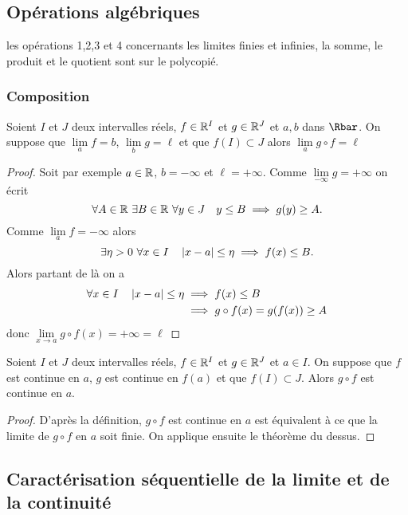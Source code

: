 \subsection{Opérations algébriques}

les opérations 1,2,3 et 4 concernants les limites finies et infinies, la somme, le produit et le quotient sont sur le polycopié.

\subsubsection{Composition}
\begin{theo}
  Soient $I$ et $J$ deux intervalles réels, $f \in \mathbb{R}^I$ et $g \in \mathbb{R}^J$ et $a,b$ dans $\Rbar$. On suppose que $\lim\limits_{a}f=b$, $\lim\limits_{b}g=\ell$ et que $f(I) \subset J$ alors $\lim\limits_{a} g \circ f=\ell$
\end{theo}
\begin{proof}
  Soit par exemple $a \in \mathbb{R}$, $b=-\infty$ et $\ell=+\infty$. Comme $\lim\limits_{-\infty}g=+\infty$ on écrit
  \begin{equation}
    \forall A \in \mathbb{R} \ \exists B \in \mathbb{R} \ \forall y \in J \quad y \leq B \implies g(y) \geq A.
  \end{equation}
  Comme $\lim\limits_{a}f=-\infty$ alors
  \begin{equation}
    \exists \eta > 0 \ \forall x \in I \quad \left\lvert x-a\right\rvert \leq \eta \implies f(x) \leq B.
  \end{equation}
  Alors partant de là on a
\begin{align}
  \forall x \in I \quad \left\lvert x-a\right\rvert \leq \eta &\implies f(x) \leq B\\
  &\implies g \circ f(x)=g(f(x)) \geq A
\end{align}
donc $\lim\limits_{x \to a} g \circ f(x)=+\infty=\ell$
\end{proof}
\begin{cor}
  Soient $I$ et $J$ deux intervalles réels, $f \in \mathbb{R}^I$ et $g \in \mathbb{R}^J$ et $a \in I$. On suppose que $f$ est continue en $a$, $g$ est continue en $f(a)$ et que $f(I) \subset J$. Alors $g \circ f$ est continue en $a$.
\end{cor}
\begin{proof}
  D'après la définition, $g \circ f$ est continue en $a$ est équivalent à ce que la limite de $g \circ f$ en $a$ soit finie. On applique ensuite le théorème du dessus.
\end{proof}

\subsection[Caractérisation séquentielle]{Caractérisation séquentielle de la limite et de la continuité}

